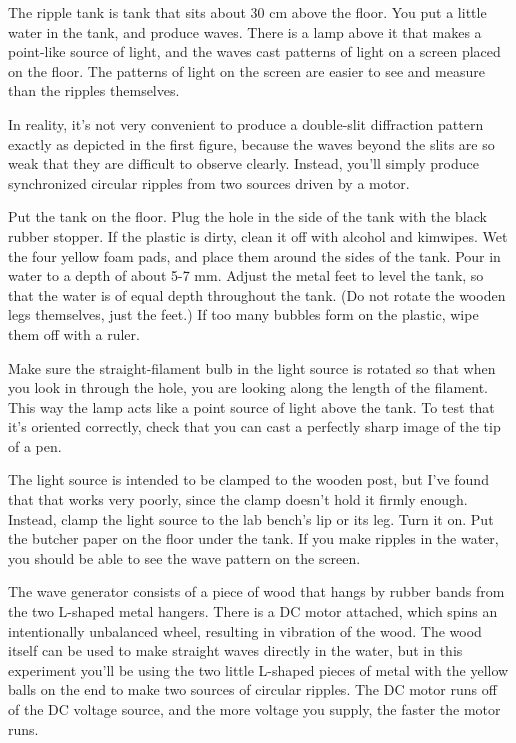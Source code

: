 
The ripple tank is tank that sits about 30 cm above the
floor. You put a little water in the tank, and produce
waves. There is a lamp above it that makes a point-like
source of light, and the waves cast patterns of light on a
screen placed on the floor. The patterns of light on the
screen are easier to see and measure than the ripples themselves.

In reality, it's not very convenient to produce a double-slit
diffraction pattern exactly as depicted in the first figure,
because the waves beyond the slits are so weak that they are
difficult to observe clearly. Instead, you'll simply produce
synchronized circular ripples from two sources driven by a motor.

Put the tank on the floor. Plug the hole in the side of the
tank with the black rubber stopper. If the plastic is dirty, clean
it off with alcohol and kimwipes. Wet the four yellow
foam pads, and place them around the sides of the tank. Pour in water to
a depth of about 5-7 mm. Adjust the metal feet to level the
tank, so that the water is of equal depth throughout the
tank. (Do not rotate the wooden legs themselves, just the feet.)
If too many bubbles form on the plastic, wipe them off with a ruler.

Make sure the straight-filament bulb in the light source is
rotated so that when you look in through the hole, you are
looking along the length of the filament. This way the lamp
acts like a point source of light above the tank. To test that
it's oriented correctly, check that you can cast a perfectly
sharp image of the tip of a pen.

The light source is intended to be clamped to the wooden post, but
I've found that that works very poorly, since the clamp doesn't
hold it firmly enough. Instead, clamp the light source to the
lab bench's lip or its leg.
Turn it on. Put the butcher paper
on the floor under the tank. If you make
ripples in the water, you should be able to see the wave
pattern on the screen.

The wave generator consists of a piece of wood that hangs by
rubber bands from the two L-shaped metal hangers. There is a
DC motor attached, which spins an intentionally unbalanced
wheel, resulting in vibration of the wood. The wood itself
can be used to make straight waves directly in the water,
but in this experiment you'll be using the two little
L-shaped pieces of metal with the yellow balls on the end to
make two sources of circular ripples. The DC motor runs off
of the DC voltage source, and the more voltage you supply,
the faster the motor runs.

